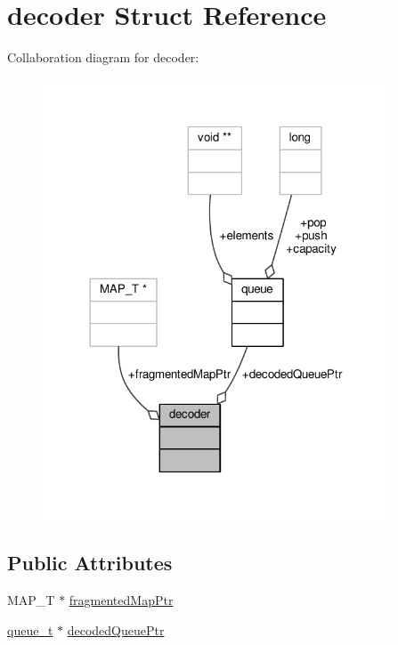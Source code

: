 \hypertarget{structdecoder}{\section{decoder Struct Reference}
\label{structdecoder}
}


Collaboration diagram for decoder\-:
\nopagebreak
\begin{figure}[H]
\begin{center}
\leavevmode
\includegraphics[width=293pt]{structdecoder__coll__graph}
\end{center}
\end{figure}
\subsection*{Public Attributes}
\begin{DoxyCompactItemize}
\item 
M\-A\-P\-\_\-\-T $\ast$ \hyperlink{structdecoder_a8f3a47c3becb3b3451cfe04af8c223ca}{fragmented\-Map\-Ptr}
\item 
\hyperlink{queue_8h_aa8acf648f3b0c69d7e132fcc61dc58c7}{queue\-\_\-t} $\ast$ \hyperlink{structdecoder_a23dea21498aabc512f1b401dc66bb1c4}{decoded\-Queue\-Ptr}
\end{DoxyCompactItemize}


